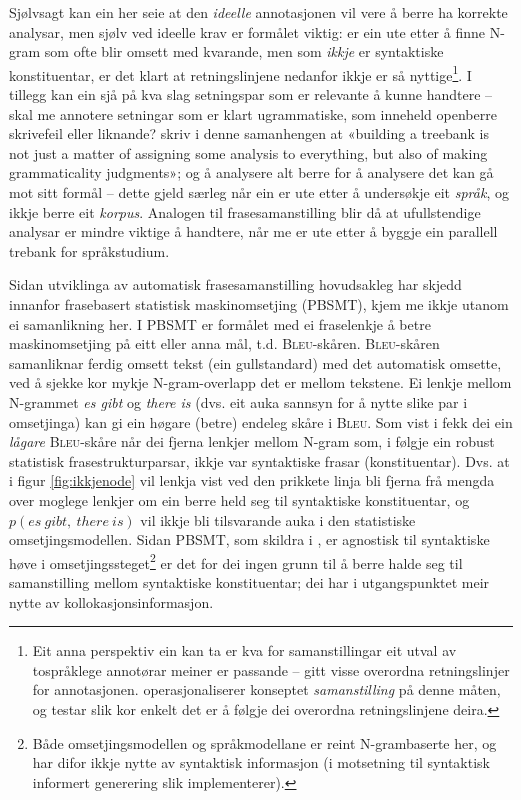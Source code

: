 \documentclass[12pt,a4paper,oneside,draft]{report}
\newcommand{\Bleu}{\textsc{Bleu}}
\begin{document}
Sjølvsagt kan ein her seie at den \emph{ideelle} annotasjonen vil vere å
 berre ha korrekte analysar, men sjølv ved ideelle krav er formålet
 viktig: er ein ute etter å finne N-gram som ofte blir omsett med
 kvarande, men som \emph{ikkje} er syntaktiske konstituentar, er det klart
 at retningslinjene nedanfor ikkje er så nyttige\footnote{Eit anna perspektiv ein kan ta er kva for samanstillingar eit
        utval av tospråklege annotørar meiner er passande -- gitt
        visse overordna retningslinjer for
        annotasjonen. \citet{volk2008hjp} operasjonaliserer konseptet
        \emph{samanstilling} på denne måten, og testar slik kor enkelt det
        er å følgje dei overordna retningslinjene deira. }. I tillegg kan
 ein sjå på kva slag setningspar som er relevante å kunne handtere --
 skal me annotere setningar som er klart ugrammatiske, som inneheld
 openberre skrivefeil eller liknande? \citet[s.~158]{rosen2007tmt}
 skriv i denne samanhengen at «building a treebank is not just a
 matter of assigning some analysis to everything, but also of making
 grammaticality judgments»; og å analysere alt berre for å analysere
 det kan gå mot sitt formål -- dette gjeld særleg når ein er ute etter
 å undersøkje eit \emph{språk}, og ikkje berre eit \emph{korpus}. Analogen til
 frasesamanstilling blir då at ufullstendige analysar er mindre
 viktige å handtere, når me er ute etter å byggje ein parallell
 trebank for språkstudium.

Sidan utviklinga av automatisk frasesamanstilling hovudsakleg har
 skjedd innanfor frasebasert statistisk maskinomsetjing (PBSMT), kjem
 me ikkje utanom ei samanlikning her. I PBSMT er formålet med ei
 fraselenkje å betre maskinomsetjing på eitt eller anna mål,
 t.d. \Bleu-skåren. \Bleu-skåren samanliknar ferdig omsett tekst (ein
 gullstandard) med det automatisk omsette, ved å sjekke kor mykje
 N-gram-overlapp det er mellom tekstene. Ei lenkje mellom N-grammet
 \emph{es gibt} og \emph{there is} (dvs. eit auka sannsyn for å nytte slike par
 i omsetjinga) kan gi ein høgare (betre) endeleg skåre i \Bleu. Som
 vist i \citet{koehn2003spb} fekk dei ein \emph{lågare} \Bleu-skåre når dei
 fjerna lenkjer mellom N-gram som, i følgje ein robust
 statistisk frasestrukturparsar, ikkje var syntaktiske frasar
 (konstituentar). Dvs. at i figur \ref{fig:ikkjenode} vil lenkja vist
 ved den prikkete linja bli fjerna frå mengda over moglege lenkjer om
 ein berre held seg til syntaktiske konstituentar, og
 $p(es~gibt,~there~is)$ vil ikkje bli tilsvarande auka i den
 statistiske omsetjingsmodellen. Sidan PBSMT, som skildra i
 \citet{koehn2003spb}, er agnostisk til syntaktiske høve i
 omsetjingssteget\footnote{Både omsetjingsmodellen og språkmodellane er reint
      N-grambaserte her, og har difor ikkje nytte av syntaktisk
      informasjon (i motsetning til syntaktisk informert generering
      slik \citet{riezler2006gmt} implementerer). } er det for dei ingen grunn til å berre halde
 seg til samanstilling mellom syntaktiske konstituentar; dei har i
 utgangspunktet meir nytte av kollokasjonsinformasjon.
\end{document}
